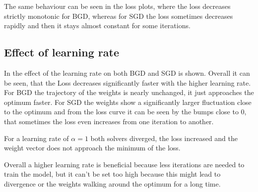 \documentclass[12pt,a4paper]{scrartcl}
\begin{document}
	The same behaviour can be seen in the loss plots, where the loss decreases strictly monotonic for BGD, whereas for SGD the loss sometimes decreases rapidly and then it stays almost constant for some iterations.	
	
	\subsection*{Effect of learning rate}
	
	In  the effect of the learning rate on both BGD and SGD is shown.
	Overall it can be seen, that the Loss decreases significantly faster with the higher learning rate. For BGD the trajectory of the weights is nearly unchanged, it just approaches the optimum faster. 
	For SGD the weights show a significantly larger fluctuation close to the optimum and from the loss curve it can be seen by the bumps close to 0, that sometimes the loss even increases from one iteration to another.
	
	For a learning rate of $\alpha = 1$ both solvers diverged, the loss increased and the weight vector does not approach the minimum of the loss.
	
	Overall a higher learning rate is beneficial because less iterations are needed to train the model, but it can't be set too high because this might lead to divergence or the weights walking around the optimum for a long time.
	
\end{document}
